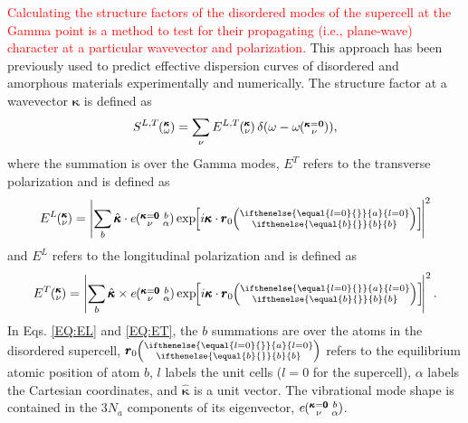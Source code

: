 \documentclass[aps,prb,twocolumn,superscriptaddress,footinbib,amsmath,amssymb,floatfix]{revtex4}
\newcommand{\EXP}[1]{\exp\mspace{-5.0mu}\left[#1\right]\mspace{-3.0mu}}
\newcommand{\ab}[2]{\mspace{-4.0mu}\left(\mspace{-8.0mu}
\begin{smallmatrix}&\ifthenelse{\equal{#1}{}}{a}{#1} \\&\ifthenelse
{\equal{#2}{}}{b}{#2}\end{smallmatrix}\mspace{-3.0mu}\right)}
\newcommand{\kgvba}{\mspace{-4.0mu}\left(\mspace{-8.0mu}
\begin{smallmatrix} &\pmb{\kappa}=\pmb{0} &b \\ &\nu 
&\alpha\end{smallmatrix}\mspace{-3.0mu}\right)}
\newcommand{\kgv}{\mspace{-4.0mu}\left(\mspace{-8.0mu}
\begin{smallmatrix}&\pmb{\kappa}=\mathbf{0} \\&\nu\end{smallmatrix}
\mspace{-3.0mu}\right)}
\newcommand{\kv}{\mspace{-4.0mu}\left(\mspace{-8.0mu}
\begin{smallmatrix}&\pmb{\kappa} \\&\nu\end{smallmatrix}
\mspace{-3.0mu}\right)}
\newcommand{\kw}{\mspace{-4.0mu}\left(\mspace{-8.0mu}
\begin{smallmatrix}&\pmb{\kappa} \\&\omega\end{smallmatrix}
\mspace{-3.0mu}\right)}
\begin{document}
\textcolor{red}{
Calculating the structure factors of the 
disordered modes of the supercell at the Gamma point 
is a method to test for their propagating (i.e., plane-wave)  
character at a particular wavevector and 
polarization. 
}
This approach has been previously used to predict 
effective dispersion curves of disordered and amorphous materials 
experimentally
\cite{ruzicka_evidence_2004,baldi_thermal_2008,baldi_sound_2010,
baldi_emergence_2013}  
and 
numerically.
\cite{taraskin_determination_1999,
horbach_high_2001,feldman_calculations_2002,
beltukov_ioffe-regel_2013,larkin_predicting_2013} 
The structure factor at a wavevector 
$\pmb{\kappa}$ is defined as\cite{allen_diffusons_1999} 
\begin{equation}\label{EQ:SLT}
S^{L,T}\kw = 
\sum_{\nu} E^{L,T}\kv
\delta (\omega-\omega\kgv),
\end{equation}
where the summation is over the Gamma modes, $E^{T}$ refers 
to the transverse polarization and is defined as
\begin{equation}\label{EQ:EL}
E^L\kv = 
\left|
\sum_{b} 
\hat{\pmb{\kappa}} \cdot e\kgvba 
\EXP{i\pmb{\kappa}\cdot\pmb{r}_0\ab{l=0}{b}} 
\right|^2
\end{equation}
and $E^{L}$ refers to the longitudinal polarization and is defined as
\begin{equation}\label{EQ:ET}
E^T\kv = 
\left|
\sum_{b} 
\hat{\pmb{\kappa}} \times e\kgvba 
\EXP{i\pmb{\kappa}\cdot\pmb{r}_0\ab{l=0}{b}} 
\right|^2.
\end{equation}
In Eqs. \eqref{EQ:EL} and \eqref{EQ:ET}, the $b$ summations are 
over the atoms in the disordered supercell, 
$\pmb{r}_0\ab{l=0}{b}$ refers to the equilibrium atomic position of 
atom $b$, $l$ labels the unit cells 
($l=0$ for the supercell), 
$\alpha$ labels the Cartesian coordinates, and 
$\hat{\pmb{\kappa}}$ is a unit vector.  
The vibrational mode shape is contained in the 
$3N_a$ components of its eigenvector, $e\kgvba$.
\end{document}

